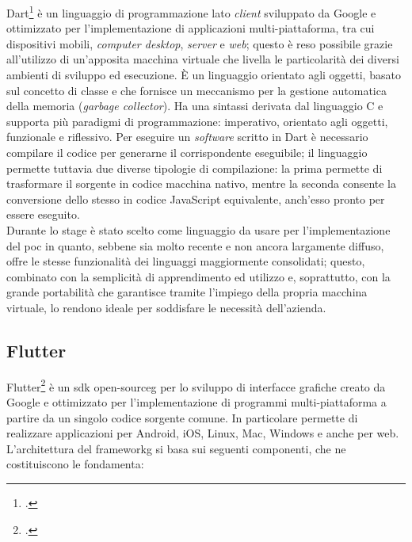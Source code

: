 Dart\footcite{site:dart} è un linguaggio di programmazione lato \textit{client} sviluppato da Google e ottimizzato per l'implementazione di applicazioni multi-piattaforma, tra cui dispositivi mobili, \textit{computer desktop}, \textit{server} e \textit{web}; questo è reso possibile grazie all'utilizzo di un'apposita macchina virtuale che livella le particolarità dei diversi ambienti di sviluppo ed esecuzione. È un linguaggio orientato agli oggetti, basato sul concetto di classe e che fornisce un meccanismo per la gestione automatica della memoria (\textit{garbage collector}). Ha una sintassi derivata dal linguaggio C e supporta più paradigmi di programmazione: imperativo, orientato agli oggetti, funzionale e riflessivo. Per eseguire un \textit{software} scritto in Dart è necessario compilare il codice per generarne il corrispondente eseguibile; il linguaggio permette tuttavia due diverse tipologie di compilazione: la prima permette di trasformare il sorgente in codice macchina nativo, mentre la seconda consente la conversione dello stesso in codice JavaScript equivalente, anch'esso pronto per essere eseguito.\\
Durante lo stage è stato scelto come linguaggio da usare per l'implementazione del \gls{poc} in quanto, sebbene sia molto recente e non ancora largamente diffuso, offre le stesse funzionalità dei linguaggi maggiormente consolidati; questo, combinato con la semplicità di apprendimento ed utilizzo e, soprattutto, con la grande portabilità che garantisce tramite l'impiego della propria macchina virtuale, lo rendono ideale per soddisfare le necessità dell'azienda.

\subsection{Flutter}

Flutter\footcite{site:flutter} è un \gls{sdk}\glsfirstoccur{} \gls{open-sourceg} per lo sviluppo di interfacce grafiche creato da Google e ottimizzato per l'implementazione di programmi multi-piattaforma a partire da un singolo codice sorgente comune. In particolare permette di realizzare applicazioni per Android, iOS, Linux, Mac, Windows e anche per web.\\
L'architettura del \gls{frameworkg}\glsfirstoccur{} si basa sui seguenti componenti, che ne costituiscono le fondamenta:

